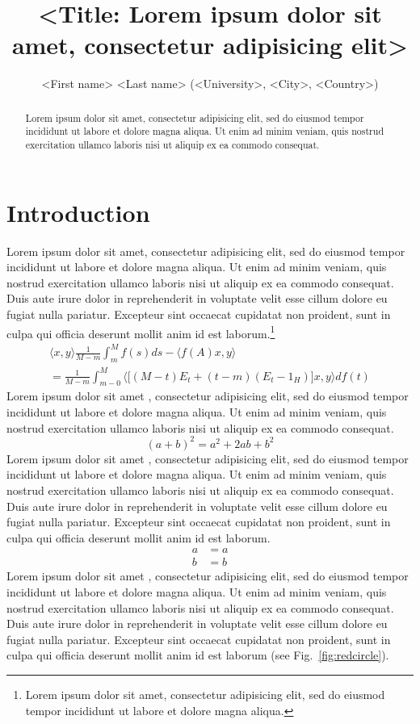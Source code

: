 \documentclass{article}
\author{<First name> <Last name> (<University>, <City>, <Country>)}
\title{<Title: Lorem ipsum dolor sit amet, consectetur adipisicing elit>}
\begin{document}
   
\maketitle

\begin{abstract}
Lorem ipsum dolor sit amet, consectetur adipisicing elit, sed do eiusmod tempor incididunt ut labore et dolore magna aliqua. Ut enim ad minim veniam, quis nostrud exercitation ullamco laboris nisi ut aliquip ex ea commodo consequat.
\end{abstract}

\section{Introduction}\label{sec:intro}

Lorem ipsum dolor sit amet, consectetur adipisicing elit, sed do eiusmod tempor incididunt ut labore et dolore magna aliqua. Ut enim ad minim veniam, quis nostrud exercitation ullamco laboris nisi ut aliquip ex ea commodo consequat. Duis aute irure dolor in reprehenderit in voluptate velit esse cillum dolore eu fugiat nulla pariatur. Excepteur sint occaecat cupidatat non proident, sunt in culpa qui officia deserunt mollit anim id est laborum.\footnote{Lorem ipsum dolor sit amet, consectetur adipisicing elit, sed do eiusmod tempor incididunt ut labore et dolore magna aliqua.}
\begin{multline}
\langle x,y\rangle \frac{1}{M-m}\int_{m}^{M}f(s) ds-\langle f(A) x,y\rangle   \\
 =\frac{1}{M-m}\int_{m-0}^{M}
\Big\langle \big[(M-t) E_{t}+(t-m) (E_{t}-1_{H})\big] x,y\Big\rangle df(t)  
\end{multline}
Lorem ipsum dolor sit amet \cite{Lamport94}, consectetur adipisicing elit, sed do eiusmod tempor incididunt ut labore et dolore magna aliqua. Ut enim ad minim veniam, quis nostrud exercitation ullamco laboris nisi ut aliquip ex ea commodo consequat. 
\[
(a+b)^2=a^2+2ab+b^2
\]
Lorem ipsum dolor sit amet \cite{Lamport11}, consectetur adipisicing elit, sed do eiusmod tempor incididunt ut labore et dolore magna aliqua. Ut enim ad minim veniam, quis nostrud exercitation ullamco laboris nisi ut aliquip ex ea commodo consequat. Duis aute irure dolor in reprehenderit in voluptate velit esse cillum dolore eu fugiat nulla pariatur. Excepteur sint occaecat cupidatat non proident, sunt in culpa qui officia deserunt mollit anim id est laborum.
\begin{align} 
 a & = a\\ 
 b & = b
\end{align}
Lorem ipsum dolor sit amet \cite{AguileraGL08}, consectetur adipisicing elit, sed do eiusmod tempor incididunt ut labore et dolore magna aliqua. Ut enim ad minim veniam, quis nostrud exercitation ullamco laboris nisi ut aliquip ex ea commodo consequat. Duis aute irure dolor in reprehenderit in voluptate velit esse cillum dolore eu fugiat nulla pariatur. Excepteur sint occaecat cupidatat non proident, sunt in culpa qui officia deserunt mollit anim id est laborum (see Fig.~\ref{fig:redcircle}).
\end{document}
